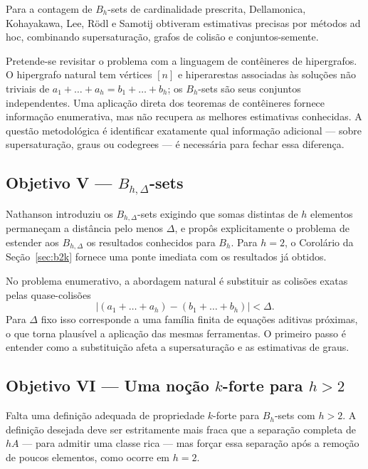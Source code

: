 \documentclass[11pt,a4paper]{article}
\theoremstyle{definition}
\theoremstyle{remark}
\begin{document}
Para a contagem de \(B_h\)-sets de cardinalidade prescrita, Dellamonica,
Kohayakawa, Lee, Rödl e Samotij obtiveram estimativas precisas por
métodos ad hoc, combinando supersaturação, grafos de colisão e
conjuntos-semente.

Pretende-se revisitar o problema com a linguagem de contêineres de
hipergrafos. O hipergrafo natural tem vértices \([n]\) e hiperarestas
associadas às soluções não triviais de
\(a_1+\dots+a_h=b_1+\dots+b_h\); os \(B_h\)-sets são seus conjuntos
independentes. Uma aplicação direta dos teoremas de contêineres fornece
informação enumerativa, mas não recupera as melhores estimativas
conhecidas. A questão metodológica é identificar exatamente qual
informação adicional --- sobre supersaturação, graus ou codegrees --- é
necessária para fechar essa diferença.

\subsection{Objetivo V --- \texorpdfstring{\(B_{h,\Delta}\)}{Bh,Delta}-sets}

Nathanson introduziu os \(B_{h,\Delta}\)-sets exigindo que somas
distintas de \(h\) elementos permaneçam a distância pelo menos
\(\Delta\), e propôs explicitamente o problema de estender aos
\(B_{h,\Delta}\) os resultados conhecidos para \(B_h\). Para \(h=2\), o
Corolário da Seção~\ref{sec:b2k} fornece uma ponte imediata com os
resultados já obtidos.

No problema enumerativo, a abordagem natural é substituir as colisões
exatas pelas quase-colisões
\[
  \bigl|(a_1+\dots+a_h)-(b_1+\dots+b_h)\bigr|<\Delta .
\]
Para \(\Delta\) fixo isso corresponde a uma família finita de equações
aditivas próximas, o que torna plausível a aplicação das mesmas
ferramentas. O primeiro passo é entender como a substituição afeta a
supersaturação e as estimativas de graus.

\subsection{Objetivo VI --- Uma noção \texorpdfstring{\(k\)}{k}-forte para \texorpdfstring{\(h>2\)}{h>2}}

Falta uma definição adequada de propriedade \(k\)-forte para
\(B_h\)-sets com \(h>2\). A definição desejada deve ser estritamente
mais fraca que a separação completa de \(hA\) --- para admitir uma
classe rica --- mas forçar essa separação após a remoção de poucos
elementos, como ocorre em \(h=2\).
\end{document}
